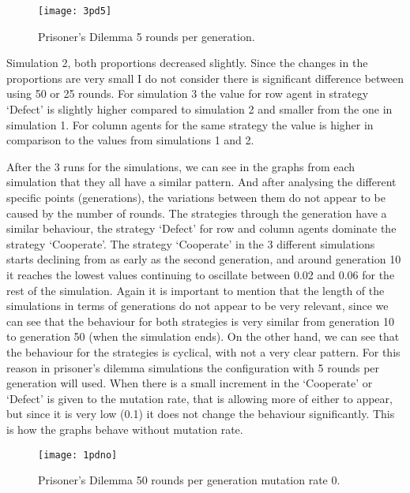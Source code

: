 \documentclass{book}
\begin{document}
\begin{figure}[H]
\begin{center}
	\texttt{[image: 3pd5]}

\caption{Prisoner's Dilemma 5 rounds per generation.}
\label{fig:pds3}
\end{center}
\end{figure}

Simulation 2, both proportions decreased slightly. Since the changes in the proportions are very small I do not consider there is significant difference between using 50 or 25 rounds. For simulation 3 the value for row agent in strategy `Defect' is slightly higher compared to simulation 2  and smaller from the one in simulation 1. For column agents for the same strategy the value is higher in comparison to the values from simulations 1 and 2.


After the 3 runs for the simulations, we can see in the graphs from each simulation that they all have a similar pattern. And after analysing the different specific points (generations), the variations between them do not appear to be caused by the number of rounds. The strategies through the generation have a similar behaviour, the strategy `Defect' for row and column agents dominate the strategy `Cooperate'. The strategy `Cooperate' in the 3 different simulations starts declining from as early as the second generation, and around generation 10 it reaches the lowest values continuing to oscillate between 0.02 and 0.06 for the rest of the simulation. Again it is important to mention that the length of the simulations in terms of generations do not appear to be very relevant, since we can see that the behaviour for both strategies is very similar from generation 10 to generation 50 (when the simulation ends). On the other hand, we can see that the behaviour for the strategies is cyclical, with not a very clear pattern. For this reason in prisoner's dilemma simulations the configuration with 5 rounds per generation will used.
When there is a small increment in the `Cooperate' or `Defect' is given to the mutation rate, that is allowing more of either to appear, but since it is very low (0.1) it does not change the behaviour significantly. This is how the graphs behave without mutation rate.

\begin{figure}[H]
\begin{center}
	\texttt{[image: 1pdno]}

\caption{ Prisoner's Dilemma 50 rounds per generation mutation rate 0.}
\label{fig:pds1mr0}	
\end{center}
\end{figure}
\end{document}
